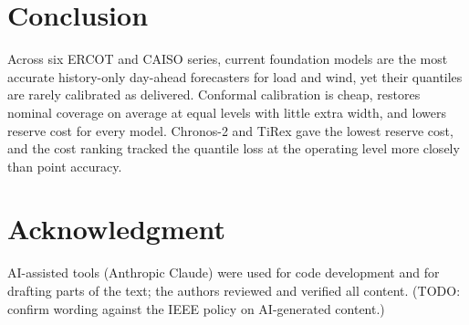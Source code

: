 \documentclass[conference]{IEEEtran}
\begin{document}
\section{Conclusion}
Across six ERCOT and CAISO series, current foundation models are the most accurate history-only day-ahead forecasters for load and wind, yet their quantiles are rarely calibrated as delivered. Conformal calibration is cheap, restores nominal coverage on average at equal levels with little extra width, and lowers reserve cost for every model. Chronos-2 and TiRex gave the lowest reserve cost, and the cost ranking tracked the quantile loss at the operating level more closely than point accuracy.

\section*{Acknowledgment}
AI-assisted tools (Anthropic Claude) were used for code development and for drafting parts of the text; the authors reviewed and verified all content. (TODO: confirm wording against the IEEE policy on AI-generated content.)
\end{document}
